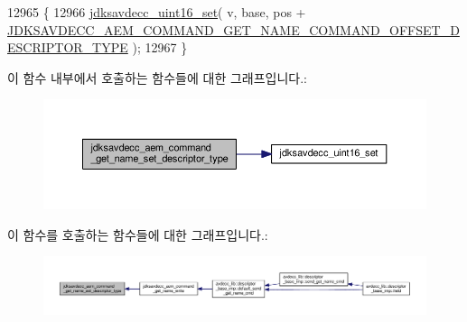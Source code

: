 \begin{DoxyCode}
12965 \{
12966     \hyperlink{group__endian_ga14b9eeadc05f94334096c127c955a60b}{jdksavdecc\_uint16\_set}( v, base, pos + 
      \hyperlink{group__command__get__name_ga712329e89d6b6ca6b96759b6f9bf434b}{JDKSAVDECC\_AEM\_COMMAND\_GET\_NAME\_COMMAND\_OFFSET\_DESCRIPTOR\_TYPE}
       );
12967 \}
\end{DoxyCode}


이 함수 내부에서 호출하는 함수들에 대한 그래프입니다.\+:
\nopagebreak
\begin{figure}[H]
\begin{center}
\leavevmode
\includegraphics[width=350pt]{group__command__get__name_gadab984a13902ca7a500337c5dff72316_cgraph}
\end{center}
\end{figure}




이 함수를 호출하는 함수들에 대한 그래프입니다.\+:
\nopagebreak
\begin{figure}[H]
\begin{center}
\leavevmode
\includegraphics[width=350pt]{group__command__get__name_gadab984a13902ca7a500337c5dff72316_icgraph}
\end{center}
\end{figure}


